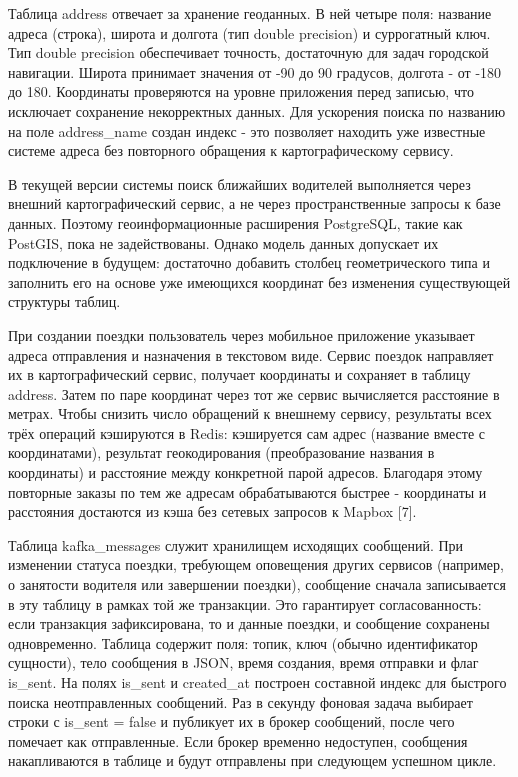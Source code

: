 {	\par \redline Таблица address отвечает за хранение геоданных. В ней четыре поля: название адреса (строка), широта и долгота (тип double precision) и суррогатный ключ. Тип double precision обеспечивает точность, достаточную для задач городской навигации. Широта принимает значения от -90 до 90 градусов, долгота - от -180 до 180. Координаты проверяются на уровне приложения перед записью, что исключает сохранение некорректных данных. Для ускорения поиска по названию на поле address\_name создан индекс - это позволяет находить уже известные системе адреса без повторного обращения к картографическому сервису.
	
	\par \redline В текущей версии системы поиск ближайших водителей выполняется через внешний картографический сервис, а не через пространственные запросы к базе данных. Поэтому геоинформационные расширения PostgreSQL, такие как PostGIS, пока не задействованы. Однако модель данных допускает их подключение в будущем: достаточно добавить столбец геометрического типа и заполнить его на основе уже имеющихся координат без изменения существующей структуры таблиц.
	
	\par \redline При создании поездки пользователь через мобильное приложение указывает адреса отправления и назначения в текстовом виде. Сервис поездок направляет их в картографический сервис, получает координаты и сохраняет в таблицу address. Затем по паре координат через тот же сервис вычисляется расстояние в метрах. Чтобы снизить число обращений к внешнему сервису, результаты всех трёх операций кэшируются в Redis: кэшируется сам адрес (название вместе с координатами), результат геокодирования (преобразование названия в координаты) и расстояние между конкретной парой адресов. Благодаря этому повторные заказы по тем же адресам обрабатываются быстрее - координаты и расстояния достаются из кэша без сетевых запросов к Mapbox [7].
	
	\par \redline Таблица kafka\_messages служит хранилищем исходящих сообщений. При изменении статуса поездки, требующем оповещения других сервисов (например, о занятости водителя или завершении поездки), сообщение сначала записывается в эту таблицу в рамках той же транзакции. Это гарантирует согласованность: если транзакция зафиксирована, то и данные поездки, и сообщение сохранены одновременно. Таблица содержит поля: топик, ключ (обычно идентификатор сущности), тело сообщения в JSON, время создания, время отправки и флаг is\_sent. На полях is\_sent и created\_at построен составной индекс для быстрого поиска неотправленных сообщений. Раз в секунду фоновая задача выбирает строки с is\_sent = false и публикует их в брокер сообщений, после чего помечает как отправленные. Если брокер временно недоступен, сообщения накапливаются в таблице и будут отправлены при следующем успешном цикле.
	
}
